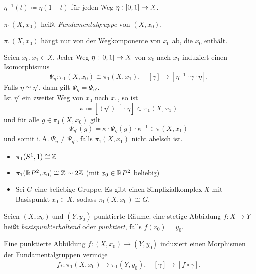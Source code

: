 \documentclass{cheat-sheet}
\begin{document}
\begin{nota}
  $\eta^{-1}(t) \coloneqq \eta(1-t)$ für jeden Weg $\eta : \left[ 0, 1 \right] \to X$.
\end{nota}

\begin{defn}
  $\pi_1(X, x_0)$ heißt \emph{Fundamentalgruppe} von $(X, x_0)$.
\end{defn}


\begin{bem}
  $\pi_1(X, x_0)$ hängt nur von der Wegkomponente von $x_0$ ab, die $x_0$ enthält.
\end{bem}

\begin{prop}
  Seien $x_0, x_1 \in X$. Jeder Weg $\eta : \left[ 0, 1 \right] \to X$ von $x_0$ nach $x_1$ induziert einen Isomorphismus
  \[ \Psi_\eta : \pi_1(X, x_0) \cong \pi_1(X, x_1), \quad [\gamma] \mapsto [\eta^{-1} \cdot \gamma \cdot \eta]. \]
  Falls $\eta \simeq \eta'$, dann gilt $\Psi_\eta = \Psi_{\eta'}$.\\
  Ist $\eta'$ ein zweiter Weg von $x_0$ nach $x_1$, so ist
  \[ \kappa \coloneqq [(\eta')^{-1} \cdot \eta] \in \pi_1(X, x_1) \]
  und für alle $g \in \pi_1(X, x_0)$ gilt
  \[ \Psi_{\eta'}(g) = \kappa \cdot \Psi_{\eta}(g) \cdot \kappa^{-1} \in \pi(X, x_1) \]
  und somit i.\,A. $\Psi_\eta \not= \Psi_{\eta'}$, falls $\pi_1(X,x_1)$ nicht abelsch ist.
\end{prop}

\begin{bspe}
  \begin{itemize}
    \item $\pi_1(S^1, 1) \cong \mathbb{Z}$
    \item $\pi_1(\mathbb{R} P^2, x_0) \cong \mathbb{Z} \sim 2 \mathbb{Z}$ (mit $x_0 \in \mathbb{R} P^2$ beliebig)
    \item Sei $G$ eine beliebige Gruppe. Es gibt einen Simplizialkomplex $X$ mit Basispunkt $x_0 \in X$, sodass $\pi_1(X, x_0) \cong G$.
  \end{itemize}
\end{bspe}

\begin{defn}
  Seien $(X, x_0)$ und $(Y, y_0)$ punktierte Räume. eine stetige Abbildung $f : X \to Y$ heißt \emph{basispunkterhaltend} oder \emph{punktiert}, falls $f(x_0) = y_0$.
\end{defn}

\begin{defn}
  Eine punktierte Abbildung $f : (X, x_0) \to (Y, y_0)$ induziert einen Morphismen der Fundamentalgruppen vermöge
  \[
    f_* : \pi_1(X, x_0) \to \pi_1(Y, y_0), \quad [\gamma] \mapsto [f \circ \gamma].
  \]
\end{defn}
\end{document}
